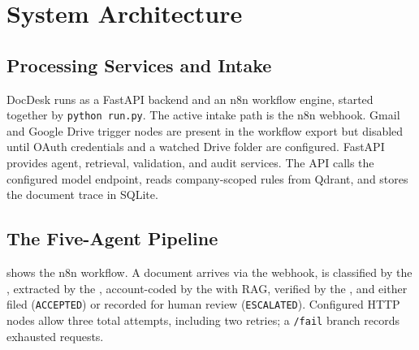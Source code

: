 \section{System Architecture}
\label{sec:architecture}

\subsection{Processing Services and Intake}

DocDesk runs as a FastAPI backend and an n8n workflow engine, started together
by \texttt{python run.py}. The active intake path is the n8n webhook. Gmail and
Google Drive trigger nodes are present in the workflow export but disabled until
OAuth credentials and a watched Drive folder are configured. FastAPI provides
agent, retrieval, validation, and audit services. The API calls the configured
model endpoint, reads company-scoped rules from Qdrant, and stores the document
trace in SQLite.

\subsection{The Five-Agent Pipeline}

 shows the n8n workflow. A document arrives via the webhook,
is classified by the , extracted by the ,
account-coded by the  with RAG, verified by the ,
and either filed (\texttt{ACCEPTED}) or recorded for human review
(\texttt{ESCALATED}). Configured HTTP nodes allow three total attempts, including
two retries; a \texttt{/fail} branch records exhausted requests.

\setcounter{figure}{1}

